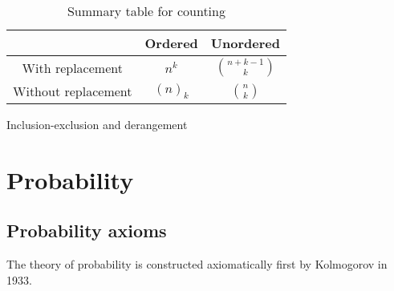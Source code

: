 \documentclass[11pt]{article}
\begin{document}
\setlength{\extrarowheight}{5pt}
\begin{table}[ht]
  \centering
  \begin{tabular}{ c | c | c }
    & Ordered & Unordered \\
    \hline
    With replacement & \(n^k\) & \(\binom{n+k-1}{k}\) \\ [5pt] 
    \hline
    Without replacement & \((n)_k\) & \(\binom{n}{k}\) \\[5pt]
  \end{tabular}
  \caption{Summary table for counting}
\end{table}

\begin{extension}{Inclusion-exclusion and derangement}
\end{extension}

\section{Probability}
\subsection{Probability axioms}
The theory of probability is constructed axiomatically first by Kolmogorov in 1933.
\end{document}

